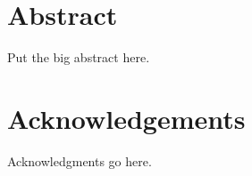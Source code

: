 



\maketitle

\chapter*{Abstract}
Put the big abstract here.

\chapter*{Acknowledgements}
Acknowledgments go here.

\tableofcontents









\appendix


\printbibliography

